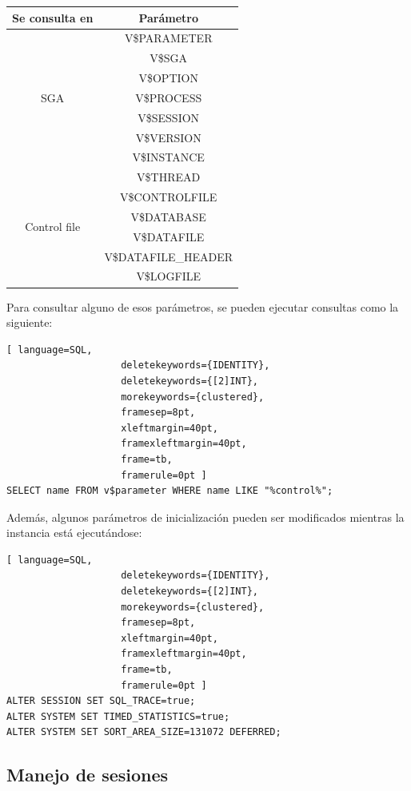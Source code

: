 \begin{center}
\begin{tabular}{|c|c|}
\hline 
Se consulta en & Parámetro \\ 
\hline 
 \multirow{7}{*}{SGA} & V\$PARAMETER \\ 
  & V\$SGA \\ 
  & V\$OPTION \\ 
  & V\$PROCESS \\ 
  & V\$SESSION \\ 
  & V\$VERSION \\ 
  & V\$INSTANCE \\ 
\hline 
\multirow{6}{*}{Control file}& V\$THREAD \\ 
  & V\$CONTROLFILE \\ 
  & V\$DATABASE \\ 
  & V\$DATAFILE \\ 
  & V\$DATAFILE\_HEADER \\ 
  & V\$LOGFILE \\ 
\hline 
\end{tabular} 
\end{center}

Para consultar alguno de esos parámetros, se pueden ejecutar consultas como la siguiente:
\begin{lstlisting}[ language=SQL,
                    deletekeywords={IDENTITY},
                    deletekeywords={[2]INT},
                    morekeywords={clustered},
                    framesep=8pt,
                    xleftmargin=40pt,
                    framexleftmargin=40pt,
                    frame=tb,
                    framerule=0pt ]
SELECT name FROM v$parameter WHERE name LIKE "%control%";
\end{lstlisting}
Además, algunos parámetros de inicialización pueden ser modificados mientras la instancia está ejecutándose:
\begin{lstlisting}[ language=SQL,
                    deletekeywords={IDENTITY},
                    deletekeywords={[2]INT},
                    morekeywords={clustered},
                    framesep=8pt,
                    xleftmargin=40pt,
                    framexleftmargin=40pt,
                    frame=tb,
                    framerule=0pt ]
ALTER SESSION SET SQL_TRACE=true;
ALTER SYSTEM SET TIMED_STATISTICS=true;
ALTER SYSTEM SET SORT_AREA_SIZE=131072 DEFERRED;
\end{lstlisting}

\subsection{Manejo de sesiones}


